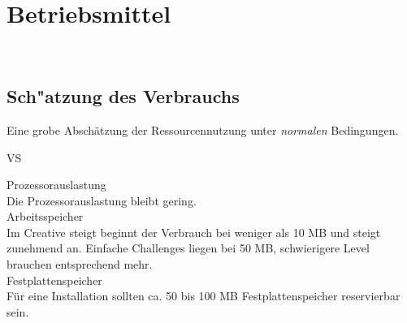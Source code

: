 %
%


\chapter{Betriebsmittel}
\label{BM}~\\

\section{Sch{"a}tzung des Verbrauchs}
\label{BM:Verbrauch}

Eine grobe Abschätzung der Ressourcennutzung unter \textit{normalen} Bedingungen.\\

\begin{ids}{\gls{VS}}

	\id[10] Prozessorauslastung \hfill\\
	
	Die Prozessorauslastung bleibt gering.\\
	
	\id[20] Arbeitsspeicher \hfill\\
	
	Im Creative steigt beginnt der Verbrauch bei weniger als 10 MB und steigt zunehmend an. Einfache Challenges liegen bei 50 MB, schwierigere Level brauchen entsprechend mehr.\\
	
	
	\id[30] Festplattenspeicher \hfill\\
		
	Für eine Installation sollten ca. 50 bis 100 MB Festplattenspeicher reservierbar sein.\\

\end{ids}


